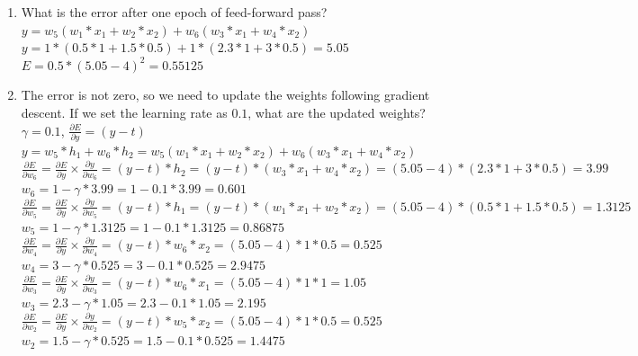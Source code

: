 \documentclass[conference]{IEEEtran}
\begin{document}
\begin{enumerate}
    \item What is the error after one epoch of feed-forward pass?\\
    $y = w_5(w_1 * x_1 + w_2 * x_2) + w_6 (w_3 * x_1 + w_4 * x_2)$\\
    $y = 1*(0.5*1+1.5*0.5)+1*(2.3*1+3*0.5) = 5.05$\\
    $E = 0.5 * (5.05-4)^2 = 0.55125$
    \item The error is not zero, so we need to update the weights following gradient descent. If we set the learning rate as $0.1$, what are the updated weights?\\
    $\gamma = 0.1$, $\frac{\partial E}{\partial y} = (y-t)$\\
    $y = w_5*h_1 + w_6*h_2 = w_5(w_1 * x_1 + w_2 * x_2) + w_6 (w_3 * x_1 + w_4 * x_2)$\\

	$\frac{\partial E}{\partial w_6}=\frac{\partial E}{\partial y} \times \frac{\partial y}{\partial w_6}=(y-t)*h_2=(y-t)*(w_3 * x_1 + w_4 * x_2)=(5.05-4)*(2.3*1+3*0.5)=3.99$\\
	$w_6 = 1 - \gamma * 3.99 = 1 - 0.1 * 3.99 = 0.601$\\
	
	$\frac{\partial E}{\partial w_5}=\frac{\partial E}{\partial y} \times \frac{\partial y}{\partial w_5}=(y-t)*h_1=(y-t)*(w_1 * x_1 + w_2 * x_2)=(5.05-4)*(0.5*1+1.5*0.5)=1.3125$\\
	$w_5=1 - \gamma * 1.3125 = 1 - 0.1 * 1.3125 = 0.86875$\\
	
	$\frac{\partial E}{\partial w_4}=\frac{\partial E}{\partial y} \times \frac{\partial y}{\partial w_4}=(y-t)*w_6 * x_2 = (5.05 - 4) * 1 * 0.5 = 0.525$\\
	$w_4=3-\gamma*0.525=3-0.1*0.525=2.9475$\\
	
	$\frac{\partial E}{\partial w_3}=\frac{\partial E}{\partial y} \times \frac{\partial y}{\partial w_3}=(y-t)*w_6*x_1 = (5.05-4)*1*1=1.05$\\
	$w_3=2.3-\gamma*1.05=2.3-0.1*1.05=2.195$\\

	$\frac{\partial E}{\partial w_2}=\frac{\partial E}{\partial y} \times \frac{\partial y}{\partial w_2}=(y-t)*w_5*x_2=(5.05-4)*1*0.5=0.525$\\
	$w_2=1.5-\gamma*0.525 = 1.5-0.1*0.525=1.4475$\\


\end{enumerate}
\end{document}
